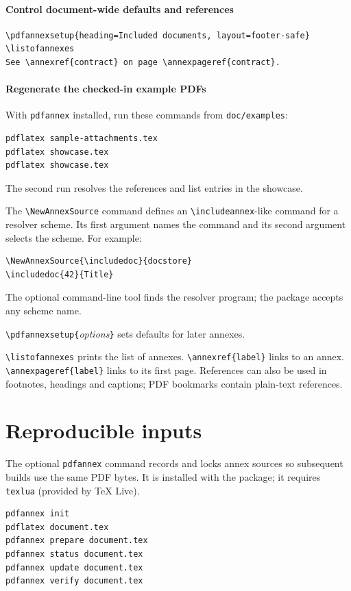 \documentclass{article}
\begin{document}
\paragraph{Control document-wide defaults and references}
\begin{verbatim}
\pdfannexsetup{heading=Included documents, layout=footer-safe}
\listofannexes
See \annexref{contract} on page \annexpageref{contract}.
\end{verbatim}

\paragraph{Regenerate the checked-in example PDFs}
With \texttt{pdfannex} installed, run these commands from
\texttt{doc/examples}:
\begin{verbatim}
pdflatex sample-attachments.tex
pdflatex showcase.tex
pdflatex showcase.tex
\end{verbatim}
The second run resolves the references and list entries in the showcase.

The \verb|\NewAnnexSource| command defines an \verb|\includeannex|-like
command for a resolver scheme. Its first argument names the command and its
second argument selects the scheme. For example:
\begin{verbatim}
\NewAnnexSource{\includedoc}{docstore}
\includedoc{42}{Title}
\end{verbatim}
The optional command-line tool finds the resolver program; the package accepts
any scheme name.


\verb|\pdfannexsetup{|\emph{options}\verb|}| sets defaults for later annexes.

\verb|\listofannexes| prints the list of annexes.
\verb|\annexref{label}| links to an annex.
\verb|\annexpageref{label}| links to its first page.
References can also be used in footnotes, headings and captions; PDF bookmarks
contain plain-text references.

\section{Reproducible inputs}

The optional \texttt{pdfannex} command records and locks annex sources so
subsequent builds use the same PDF bytes. It is installed with the package;
it requires \texttt{texlua} (provided by TeX Live).

\begin{verbatim}
pdfannex init
pdflatex document.tex
pdfannex prepare document.tex
pdfannex status document.tex
pdfannex update document.tex
pdfannex verify document.tex
\end{verbatim}
\end{document}
